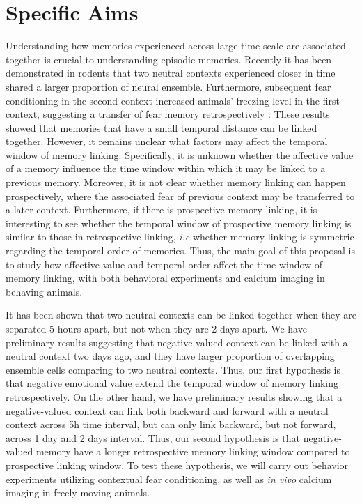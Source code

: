 \documentclass[master.tex]{subfiles}
\begin{document}
\section*{Specific Aims}

Understanding how memories experienced across large time scale are associated
together is crucial to understanding episodic memories. Recently it has been
demonstrated in rodents that two neutral contexts experienced closer in time
shared a larger proportion of neural ensemble. Furthermore, subsequent fear
conditioning in the second context increased animals' freezing level in the
first context, suggesting a transfer of fear memory retrospectively
\cite{cai_shared_2016}. These results showed that memories that have a small
temporal distance can be linked together. However, it remains unclear what
factors may affect the temporal window of memory linking. Specifically, it is
unknown whether the affective value of a memory influence the time window within
which it may be linked to a previous memory. Moreover, it is not clear whether
memory linking can happen prospectively, where the associated fear of previous
context may be transferred to a later context. Furthermore, if there is
prospective memory linking, it is interesting to see whether the temporal window
of prospective memory linking is similar to those in retrospective linking,
\textit{i.e} whether memory linking is symmetric regarding the temporal order of
memories. Thus, the main goal of this proposal is to study how affective value
and temporal order affect the time window of memory linking, with both
behavioral experiments and calcium imaging in behaving animals.

It has been shown that two neutral contexts can be linked together when they are
separated 5 hours apart, but not when they are 2 days apart. We have preliminary
results suggesting that negative-valued context can be linked with a neutral
context two days ago, and they have larger proportion of overlapping ensemble
cells comparing to two neutral contexts. Thus, our first hypothesis is that
negative emotional value extend the temporal window of memory linking
retrospectively. On the other hand, we have preliminary results showing that a
negative-valued context can link both backward and forward with a neutral
context across 5h time interval, but can only link backward, but not forward,
across 1 day and 2 days interval. Thus, our second hypothesis is that
negative-valued memory have a longer retrospective memory linking window
compared to prospective linking window. To test these hypothesis, we will carry
out behavior experiments utilizing contextual fear conditioning, as well as
\textit{in vivo} calcium imaging in freely moving animals.
\end{document}
